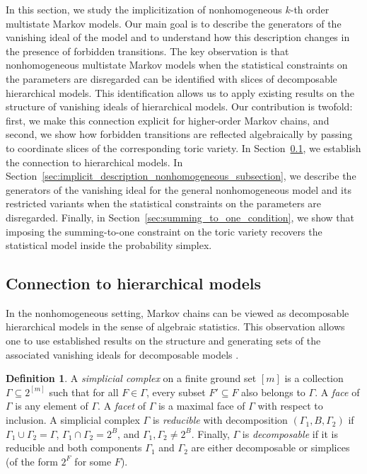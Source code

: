 \documentclass[11pt, a4paper]{article}
\numberwithin{equation}{section}
\theoremstyle{plain}
\theoremstyle{definition}
\newtheorem{definition}[theorem]{Definition}
\renewcommand{\emph}[1]{\textit{#1}}
\begin{document}
In this section, we study the implicitization of nonhomogeneous $k$-th order multistate Markov models.
Our main goal is to describe the generators of the vanishing ideal of the model and to understand how
this description changes in the presence of forbidden transitions.
The key observation is that nonhomogeneous multistate Markov models when the statistical constraints on the parameters are disregarded can be identified with slices of
decomposable hierarchical models.
This identification allows us to apply existing results on the structure of vanishing ideals
of hierarchical models.
Our contribution is twofold: first, we make this connection explicit for higher-order Markov chains,
and second, we show how forbidden transitions are reflected algebraically by passing to coordinate
slices of the corresponding toric variety.
In Section~\ref{sec:hierarchical_models}, we establish the connection to hierarchical models.
In Section~\ref{sec:implicit_description_nonhomogeneous_subsection}, we describe the generators of the
vanishing ideal for the general nonhomogeneous model and its restricted variants when the statistical constraints on the parameters are disregarded.
Finally, in Section~\ref{sec:summing_to_one_condition}, we show that imposing the summing-to-one
constraint on the toric variety recovers the statistical model inside the probability simplex.




\subsection{Connection to hierarchical models}\label{sec:hierarchical_models}
In the nonhomogeneous setting, Markov chains can be viewed as decomposable hierarchical models in the sense of algebraic statistics. This observation allows one to use established results on the structure and generating sets of the associated vanishing ideals for decomposable models \cite{dobra2003markov,diaconis1998algebraic,sullivant2023algebraic}.



\begin{definition}
A \emph{simplicial complex} on a finite ground set $[m]$ is a collection
$\Gamma \subseteq 2^{[m]}$ such that for all $F \in \Gamma$, every subset
$F' \subseteq F$ also belongs to $\Gamma$.
A \emph{face} of $\Gamma$ is any element of $\Gamma$.
A \emph{facet} of $\Gamma$ is a maximal face of $\Gamma$ with respect to inclusion.
A simplicial complex $\Gamma$ is \emph{reducible} with decomposition
$(\Gamma_1, B, \Gamma_2)$ if $\Gamma_1 \cup \Gamma_2 = \Gamma$,
$\Gamma_1 \cap \Gamma_2 = 2^B$, and $\Gamma_1,\Gamma_2 \neq 2^B$.
Finally, $\Gamma$ is \emph{decomposable} if it is reducible and both components
$\Gamma_1$ and $\Gamma_2$ are either decomposable or simplices (of the form
$2^F$ for some $F$).
\end{definition}
\end{document}

